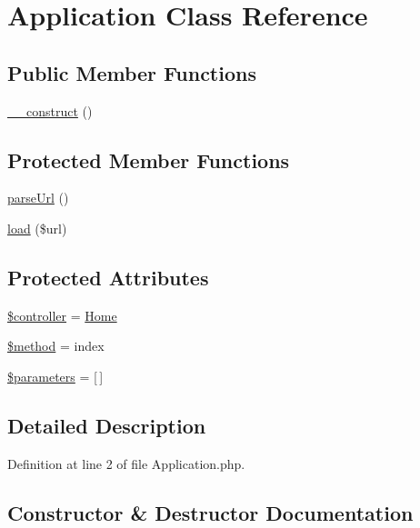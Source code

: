 \hypertarget{class_application}{}\section{Application Class Reference}
\label{class_application}
\subsection*{Public Member Functions}
\begin{DoxyCompactItemize}
\item 
\hyperlink{class_application_a97620cd12b475b39007c29c63885a373}{\+\_\+\+\_\+construct} ()
\end{DoxyCompactItemize}
\subsection*{Protected Member Functions}
\begin{DoxyCompactItemize}
\item 
\hyperlink{class_application_ac3007e038071f04135b5fcfcfdf9318c}{parse\+Url} ()
\item 
\hyperlink{class_application_aa434ce8a8cbcdd334e051004084edce9}{load} (\$url)
\end{DoxyCompactItemize}
\subsection*{Protected Attributes}
\begin{DoxyCompactItemize}
\item 
\hyperlink{class_application_aa3217a9bc7c7247a2807cd28ae2a3f1e}{\$controller} = \textquotesingle{}\hyperlink{class_home}{Home}\textquotesingle{}
\item 
\hyperlink{class_application_a35c1bd1b0587da413cb79a663dae84a6}{\$method} = \textquotesingle{}index\textquotesingle{}
\item 
\hyperlink{class_application_a9cb01d8979a55808cd1e1e5b74b1e3f6}{\$parameters} = \mbox{[}$\,$\mbox{]}
\end{DoxyCompactItemize}


\subsection{Detailed Description}


Definition at line 2 of file Application.\+php.



\subsection{Constructor \& Destructor Documentation}
\hypertarget{class_application_a97620cd12b475b39007c29c63885a373}{}\label{class_application_a97620cd12b475b39007c29c63885a373} 

